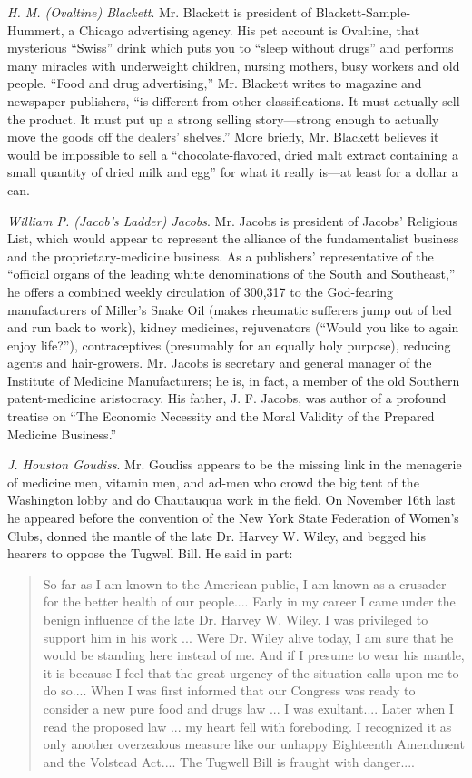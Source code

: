 \documentclass[openany,nobib]{tufte-book}
\begin{document}
\emph{H. M. (Ovaltine) Blackett}. Mr. Blackett is president of
Blackett-Sample-Hummert, a Chicago advertising agency. His pet account
is Ovaltine, that mysterious ``Swiss'' drink which puts you to ``sleep
without drugs'' and performs many miracles with underweight children,
nursing mothers, busy workers and old people. ``Food and drug
advertising,'' Mr. Blackett writes to magazine and newspaper publishers,
``is different from other classifications. It must actually sell the
product. It must put up a strong selling story---strong enough to
actually move the goods off the dealers' shelves.'' More briefly, Mr.
Blackett believes it would be impossible to sell a ``chocolate-flavored,
dried malt extract containing a small quantity of dried milk and egg''
for what it really is---at least for a dollar a can.

\emph{William P. (Jacob's Ladder) Jacobs}. Mr. Jacobs is president of
Jacobs' Religious List, which would appear to represent the alliance of
the fundamentalist business and the proprietary-medicine business. As a
publishers' representative of the ``official organs of the leading white
denominations of the South and Southeast,'' he offers a combined weekly
circulation of 300,317 to the God-fearing manufacturers of Miller's
Snake Oil (makes rheumatic sufferers jump out of bed and run back to
work), kidney medicines, rejuvenators (``Would you like to again enjoy
life?''), contraceptives (presumably for an equally holy purpose),
reducing agents and hair-growers. Mr. Jacobs is secretary and general
manager of the Institute of Medicine Manufacturers; he is, in fact, a
member of the old Southern patent-medicine aristocracy. His father, J.
F. Jacobs, was author of a profound treatise on ``The Economic Necessity
and the Moral Validity of the Prepared Medicine Business.''

\emph{J. Houston Goudiss}. Mr. Goudiss appears to be the missing link in
the menagerie of medicine men, vitamin men, and ad-men who crowd the big
tent of the Washington lobby and do Chautauqua work in the field. On
November 16th last he appeared before the convention of the New York
State Federation of Women's Clubs, donned the mantle of the late Dr.
Harvey W. Wiley, and begged his hearers to oppose the Tugwell Bill. He
said in part:

\begin{quote}
So far as I am known to the American public, I am known as a crusader
for the better health of our people.... Early in my career I came under
the benign influence of the late Dr. Harvey W. Wiley. I was privileged
to support him in his work ... Were Dr. Wiley alive today, I am sure
that he would be standing here instead of me. And if I presume to wear
his mantle, it is because I feel that the great urgency of the situation
calls upon me to do so.... When I was first informed that our Congress
was ready to consider a new pure food and drugs law ... I was
exultant.... Later when I read the proposed law ... my heart fell with
foreboding. I recognized it as only another overzealous measure like our
unhappy Eighteenth Amendment and the Volstead Act.... The Tugwell Bill
is fraught with danger....
\end{quote}
\end{document}
